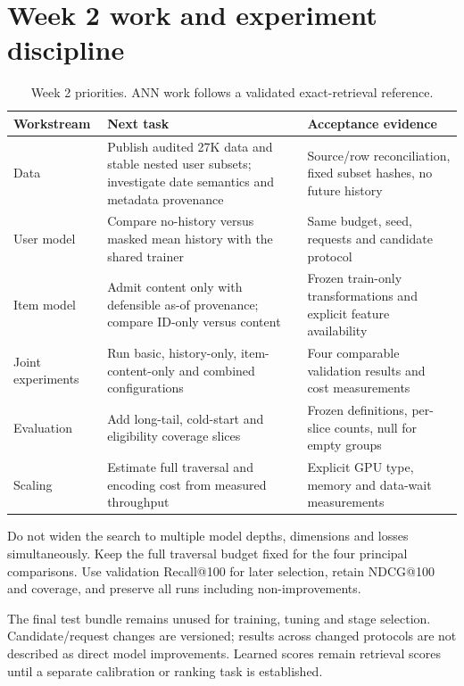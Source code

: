 \documentclass[11pt,a4paper]{article}
\begin{document}
\section{Week 2 work and experiment discipline}
\begin{table}[H]\centering\small
\begin{tabularx}{\linewidth}{lXX}\toprule
Workstream & Next task & Acceptance evidence\\\midrule
Data & Publish audited 27K data and stable nested user subsets; investigate date semantics and metadata provenance & Source/row reconciliation, fixed subset hashes, no future history\\
User model & Compare no-history versus masked mean history with the shared trainer & Same budget, seed, requests and candidate protocol\\
Item model & Admit content only with defensible as-of provenance; compare ID-only versus content & Frozen train-only transformations and explicit feature availability\\
Joint experiments & Run basic, history-only, item-content-only and combined configurations & Four comparable validation results and cost measurements\\
Evaluation & Add long-tail, cold-start and eligibility coverage slices & Frozen definitions, per-slice counts, null for empty groups\\
Scaling & Estimate full traversal and encoding cost from measured throughput & Explicit GPU type, memory and data-wait measurements\\\bottomrule
\end{tabularx}\caption{Week 2 priorities. ANN work follows a validated exact-retrieval reference.}\end{table}

Do not widen the search to multiple model depths, dimensions and losses simultaneously. Keep the full traversal budget fixed for the four principal comparisons. Use validation Recall@100 for later selection, retain NDCG@100 and coverage, and preserve all runs including non-improvements.

The final test bundle remains unused for training, tuning and stage selection. Candidate/request changes are versioned; results across changed protocols are not described as direct model improvements. Learned scores remain retrieval scores until a separate calibration or ranking task is established.
\end{document}
